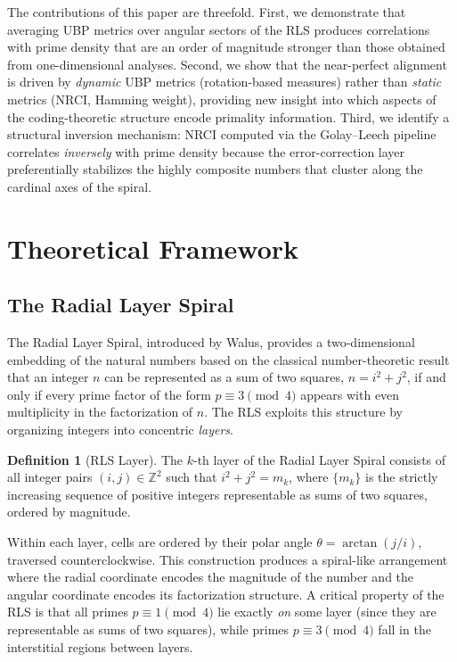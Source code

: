 \documentclass[11pt,a4paper]{article}
\theoremstyle{definition}
\newtheorem{definition}{Definition}[section]
\newcommand{\Z}{\mathbb{Z}}
\begin{document}
The contributions of this paper are threefold. First, we demonstrate that averaging UBP metrics over angular sectors of the RLS produces correlations with prime density that are an order of magnitude stronger than those obtained from one-dimensional analyses. Second, we show that the near-perfect alignment is driven by \emph{dynamic} UBP metrics (rotation-based measures) rather than \emph{static} metrics (NRCI, Hamming weight), providing new insight into which aspects of the coding-theoretic structure encode primality information. Third, we identify a structural inversion mechanism: NRCI computed via the Golay--Leech pipeline correlates \emph{inversely} with prime density because the error-correction layer preferentially stabilizes the highly composite numbers that cluster along the cardinal axes of the spiral.

\section{Theoretical Framework}\label{sec:theory}

\subsection{The Radial Layer Spiral}\label{sec:rls}

The Radial Layer Spiral, introduced by Walus\cite{walus2026}, provides a two-dimensional embedding of the natural numbers based on the classical number-theoretic result that an integer $n$ can be represented as a sum of two squares, $n = i^2 + j^2$, if and only if every prime factor of the form $p \equiv 3 \pmod{4}$ appears with even multiplicity in the factorization of $n$. The RLS exploits this structure by organizing integers into concentric \emph{layers}.

\begin{definition}[RLS Layer]\label{def:rls_layer}
The $k$-th layer of the Radial Layer Spiral consists of all integer pairs $(i, j) \in \Z^2$ such that $i^2 + j^2 = m_k$, where $\{m_k\}$ is the strictly increasing sequence of positive integers representable as sums of two squares, ordered by magnitude.
\end{definition}

Within each layer, cells are ordered by their polar angle $\theta = \arctan(j/i)$, traversed counterclockwise. This construction produces a spiral-like arrangement where the radial coordinate encodes the magnitude of the number and the angular coordinate encodes its factorization structure. A critical property of the RLS is that all primes $p \equiv 1 \pmod{4}$ lie exactly \emph{on} some layer (since they are representable as sums of two squares), while primes $p \equiv 3 \pmod{4}$ fall in the interstitial regions between layers.
\end{document}
